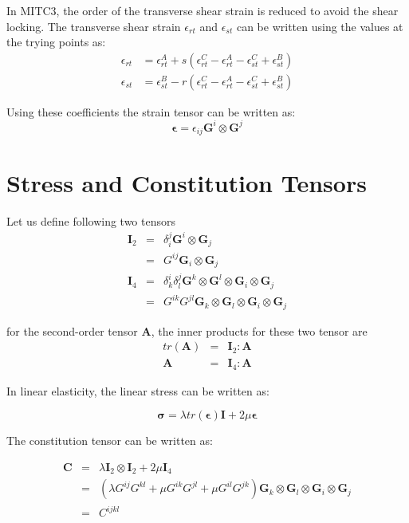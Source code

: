 \documentclass{article}
\begin{document}
In MITC3, the order of the transverse shear strain is reduced to avoid the shear locking.
%
The transverse shear strain $\epsilon_{rt}$ and $\epsilon_{st}$ can be written using the values at the trying points as:
%
\begin{align}
\epsilon_{rt} &= \epsilon_{rt}^A + s(\epsilon_{rt}^C-\epsilon_{rt}^A-\epsilon_{st}^C+\epsilon_{st}^B)\\
\epsilon_{st} &= \epsilon_{st}^B - r(\epsilon_{rt}^C-\epsilon_{rt}^A-\epsilon_{st}^C+\epsilon_{st}^B)
\end{align}

Using these coefficients the strain tensor can be written as:
\begin{equation}
\boldsymbol{\epsilon} = \epsilon_{ij}\mathbf{G}^i\otimes\mathbf{G}^j
\end{equation}


\section{Stress and Constitution Tensors}

Let us define following two tensors
%
\begin{eqnarray}
\mathbf{I}_2
&=& \delta_i^j \mathbf{G}^i\otimes\mathbf{G}_j\\
&=& G^{ij} \mathbf{G}_i\otimes\mathbf{G}_j\\
\mathbf{I}_4 
&=& \delta^i_k\delta^j_l \mathbf{G}^k\otimes\mathbf{G}^l\otimes\mathbf{G}_i\otimes\mathbf{G}_j\\
&=& G^{ik}G^{jl} \mathbf{G}_k\otimes\mathbf{G}_l\otimes\mathbf{G}_i\otimes\mathbf{G}_j
\end{eqnarray}

for the second-order tensor $\mathbf{A}$, the inner products for these two tensor are
\begin{eqnarray}
tr(\mathbf{A}) &=& \mathbf{I}_2:\mathbf{A}\\
\mathbf{A} &=& \mathbf{I}_4:\mathbf{A}
\end{eqnarray}

In linear elasticity, the linear stress can be written as:

\begin{equation}
\boldsymbol{\sigma} = \lambda tr(\boldsymbol{\epsilon}) \mathbf{I} + 2 \mu \boldsymbol{\epsilon}
\end{equation}

The constitution tensor can be written as:

\begin{eqnarray}
\mathbf{C} 
&=& \lambda \mathbf{I}_2\otimes\mathbf{I}_2 + 2\mu \mathbf{I}_4 \\
&=& (\lambda G^{ij}G^{kl} + \mu G^{ik}G^{jl} + \mu G^{il}G^{jk} )\mathbf{G}_k\otimes\mathbf{G}_l\otimes\mathbf{G}_i\otimes\mathbf{G}_j\\
&=& C^{ijkl}
\end{eqnarray}
\end{document}
